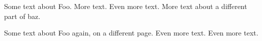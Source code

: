 \documentclass{article}
\begin{document}
Some text about Foo.
More text.
Even more text.
More text about a different part of baz.

\clearpage
Some text about Foo again, on a different page.
Even more text. %
Even more text.
\printindex
\end{document}
